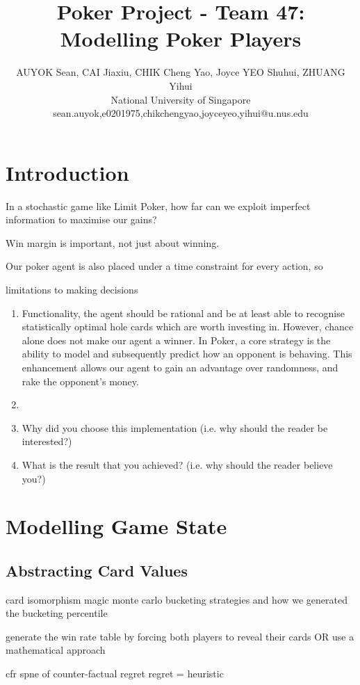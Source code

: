 \documentclass{article}
\title{Poker Project - Team 47: Modelling Poker Players}
\author{
AUYOK Sean, CAI Jiaxiu, CHIK Cheng Yao, Joyce YEO Shuhui, ZHUANG Yihui
\\ 
National University of Singapore\\
%
sean.auyok,e0201975,chikchengyao,joyceyeo,yihui@u.nus.edu
}
\begin{document}
\maketitle

\section{Introduction}

In a stochastic game like Limit Poker, how far can we exploit imperfect information to maximise our gains? 

Win margin is important, not just about winning.

Our poker agent is also placed under a time constraint for every action, so 

limitations to making decisions

\begin{enumerate}
	\item Functionality, the agent should be rational and be at least able to recognise statistically optimal hole cards which are worth investing in. However, chance alone does not make our agent a winner. In Poker, a core strategy is the ability to model and subsequently predict how an opponent is behaving. This enhancement allows our agent to gain an advantage over randomness, and rake the opponent's money.
	
	\item
	\item Why did you choose this implementation (i.e. why should the reader be interested?)
	\item What is the result that you achieved? (i.e. why should the reader believe you?)
\end{enumerate}

\section{Modelling Game State}

\subsection{Abstracting Card Values}

card isomorphism magic
monte carlo
bucketing strategies and how we generated the bucketing
percentile

generate the win rate table by forcing both players to reveal their cards
OR use a mathematical approach

cfr
spne of counter-factual regret
regret = heuristic
\end{document}
